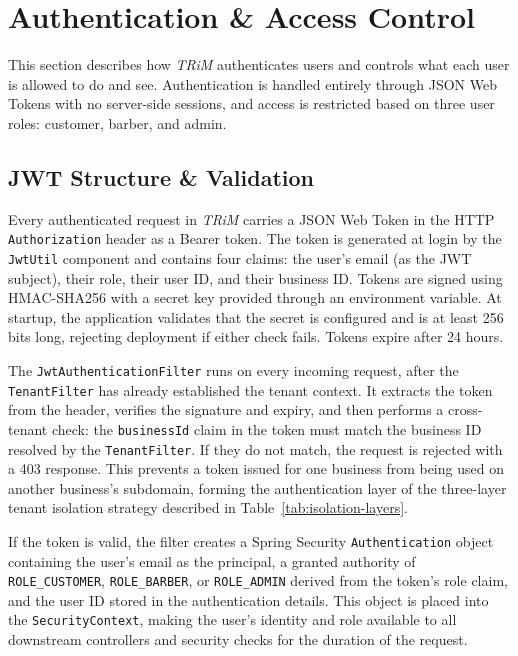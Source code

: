 \section{Authentication \& Access Control}
This section describes how \textit{TRiM} authenticates users and controls what each user is allowed to do and see. Authentication is handled entirely through JSON Web Tokens with no server-side sessions, and access is restricted based on three user roles: customer, barber, and admin.

\subsection*{JWT Structure \& Validation}
Every authenticated request in \textit{TRiM} carries a JSON Web Token in the HTTP \mbox{\texttt{Authorization}} header as a Bearer token. The token is generated at login by the \texttt{JwtUtil} component and contains four claims: the user's email (as the JWT subject), their role, their user ID, and their business ID. Tokens are signed using HMAC-SHA256 with a secret key provided through an environment variable. At startup, the application validates that the secret is configured and is at least 256 bits long, rejecting deployment if either check fails. Tokens expire after 24 hours.

The \texttt{JwtAuthenticationFilter} runs on every incoming request, after the \texttt{TenantFilter} has already established the tenant context. It extracts the token from the header, verifies the signature and expiry, and then performs a cross-tenant check: the \texttt{businessId} claim in the token must match the business ID resolved by the \texttt{TenantFilter}. If they do not match, the request is rejected with a 403 response. This prevents a token issued for one business from being used on another business's subdomain, forming the authentication layer of the three-layer tenant isolation strategy described in Table~\ref{tab:isolation-layers}.

If the token is valid, the filter creates a Spring Security \texttt{Authentication} object containing the user's email as the principal, a granted authority of \texttt{ROLE\_CUSTOMER}, \texttt{ROLE\_BARBER}, or \texttt{ROLE\_ADMIN} derived from the token's role claim, and the user ID stored in the authentication details. This object is placed into the \texttt{SecurityContext}, making the user's identity and role available to all downstream controllers and security checks for the duration of the request.

